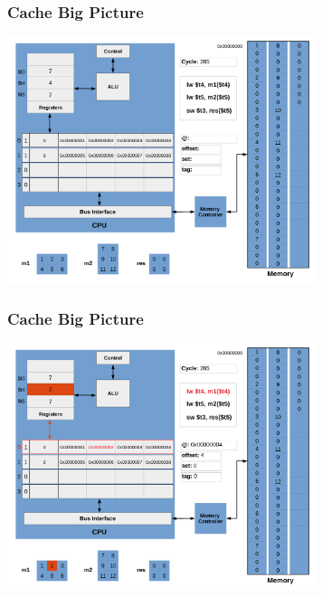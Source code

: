 \documentclass{beamer}
\begin{document}
\begin{frame}[fragile]
\frametitle{Cache Big Picture}

\begin{center}
\vspace*{-0.23cm}
\hspace*{-1cm}\includegraphics[width=9cm]{cache17.pdf}
\end{center}

\end{frame}

\begin{frame}[fragile]
\frametitle{Cache Big Picture}

\begin{center}
\vspace*{-0.23cm}
\hspace*{-1cm}\includegraphics[width=9cm]{cache18.pdf}
\end{center}

\end{frame}
\end{document}
